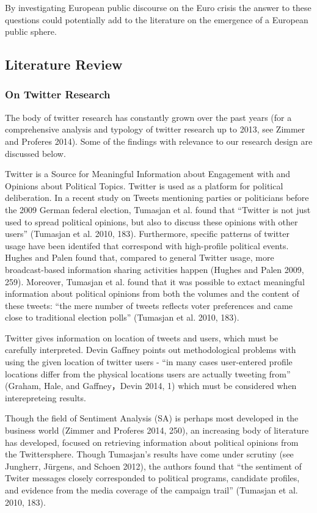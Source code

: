\documentclass[]{article}
\begin{document}
By investigating European public discourse on the Euro crisis the answer
to these questions could potentially add to the literature on the
emergence of a European public sphere.

\subsection{Literature Review}\label{literature-review}

\subsubsection{On Twitter Research}\label{on-twitter-research}

The body of twitter research has constantly grown over the past years
(for a comprehensive analysis and typology of twitter research up to
2013, see Zimmer and Proferes 2014). Some of the findings with relevance
to our research design are discussed below.

Twitter is a Source for Meaningful Information about Engagement with and
Opinions about Political Topics. Twitter is used as a platform for
political deliberation. In a recent study on Tweets mentioning parties
or politicians before the 2009 German federal election, Tumasjan et al.
found that ``Twitter is not just used to spread political opinions, but
also to discuss these opinions with other users'' (Tumasjan et al. 2010,
183). Furthermore, specific patterns of twitter usage have been
identifed that correspond with high-profile political events. Hughes and
Palen found that, compared to general Twitter usage, more
broadcast-based information sharing activities happen (Hughes and Palen
2009, 259). Moreover, Tumasjan et al. found that it was possible to
extact meaningful information about political opinions from both the
volumes and the content of these tweets: ``the mere number of tweets
reflects voter preferences and came close to traditional election
polls'' (Tumasjan et al. 2010, 183).

Twitter gives information on location of tweets and users, which must be
carefully interpreted. Devin Gaffney points out methodological problems
with using the given location of twitter users - ``in many cases
user-entered profile locations differ from the physical locations users
are actually tweeting from'' (Graham, Hale, and Gaffney，Devin 2014, 1)
which must be considered when interepreteing results.

Though the field of Sentiment Analysis (SA) is perhaps most developed in
the business world (Zimmer and Proferes 2014, 250), an increasing body
of literature has developed, focused on retrieving information about
political opinions from the Twittersphere. Though Tumasjan's results
have come under scrutiny (see Jungherr, J{ü}rgens, and Schoen 2012), the
authors found that ``the sentiment of Twiter messages closely
corresponded to political programs, candidate profiles, and evidence
from the media coverage of the campaign trail'' (Tumasjan et al. 2010,
183).
\end{document}
